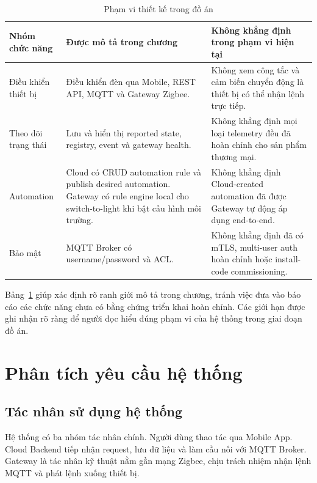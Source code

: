 \begin{table}[H]
    \centering
    \caption{Phạm vi thiết kế trong đồ án}
    \label{tab:ch3-scope-boundary}
    \footnotesize
    \setlength{\tabcolsep}{3pt}
    \begin{tabular}{|>{\raggedright\arraybackslash}p{4.0cm}|>{\raggedright\arraybackslash}p{5.2cm}|>{\raggedright\arraybackslash}p{4.8cm}|}
        \hline
        \textbf{Nhóm chức năng} & \textbf{Được mô tả trong chương} & \textbf{Không khẳng định trong phạm vi hiện tại} \\
        \hline
        Điều khiển thiết bị & Điều khiển đèn qua Mobile, REST API, MQTT và Gateway Zigbee. & Không xem công tắc và cảm biến chuyển động là thiết bị có thể nhận lệnh trực tiếp. \\
        \hline
        Theo dõi trạng thái & Lưu và hiển thị reported state, registry, event và gateway health. & Không khẳng định mọi loại telemetry đều đã hoàn chỉnh cho sản phẩm thương mại. \\
        \hline
        Automation & Cloud có CRUD automation rule và publish desired automation. Gateway có rule engine local cho switch-to-light khi bật cấu hình môi trường. & Không khẳng định Cloud-created automation đã được Gateway tự động áp dụng end-to-end. \\
        \hline
        Bảo mật & MQTT Broker có username/password và ACL. & Không khẳng định đã có mTLS, multi-user auth hoàn chỉnh hoặc install-code commissioning. \\
        \hline
    \end{tabular}
    \setlength{\tabcolsep}{6pt}
\end{table}

Bảng~\ref{tab:ch3-scope-boundary} giúp xác định rõ ranh giới mô tả trong chương, tránh việc đưa vào báo cáo các chức năng chưa có bằng chứng triển khai hoàn chỉnh. Các giới hạn được ghi nhận rõ ràng để người đọc hiểu đúng phạm vi của hệ thống trong giai đoạn đồ án.

\section{Phân tích yêu cầu hệ thống}
\label{sec:ch3-yeucau}

\subsection{Tác nhân sử dụng hệ thống}
\label{sec:ch3-actors}

Hệ thống có ba nhóm tác nhân chính. Người dùng thao tác qua Mobile App. Cloud Backend tiếp nhận request, lưu dữ liệu và làm cầu nối với MQTT Broker. Gateway là tác nhân kỹ thuật nằm gần mạng Zigbee, chịu trách nhiệm nhận lệnh MQTT và phát lệnh xuống thiết bị.

